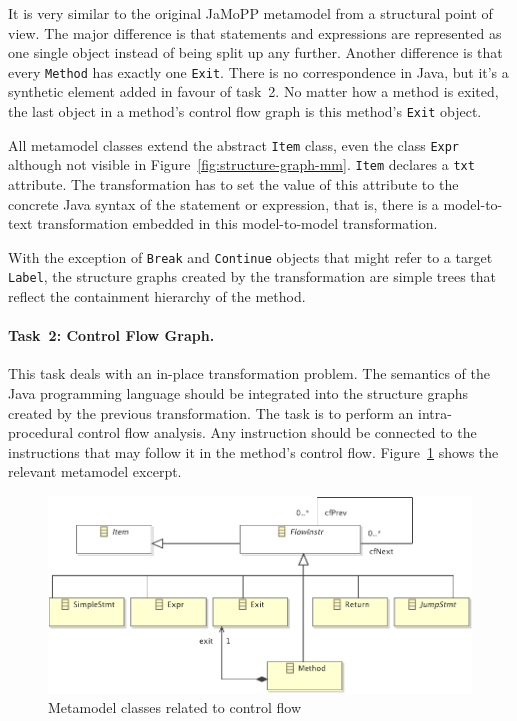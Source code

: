 \documentclass[submission]{eptcs}
\begin{document}
It is very similar to the original JaMoPP metamodel from a structural point of
view.  The major difference is that statements and expressions are represented
as one single object instead of being split up any further.  Another difference
is that every \verb|Method| has exactly one \verb|Exit|.  There is no
correspondence in Java, but it's a synthetic element added in favour of task~2.
No matter how a method is exited, the last object in a method's control flow
graph is this method's \verb|Exit| object.

All metamodel classes extend the abstract \verb|Item| class, even the class
\verb|Expr| although not visible in Figure~\ref{fig:structure-graph-mm}.
\verb|Item| declares a \verb|txt| attribute.  The transformation has to set the
value of this attribute to the concrete Java syntax of the statement or
expression, that is, there is a model-to-text transformation embedded in this
model-to-model transformation.

With the exception of \verb|Break| and \verb|Continue| objects that might refer
to a target \verb|Label|, the structure graphs created by the transformation
are simple trees that reflect the containment hierarchy of the method.

\paragraph{Task~2: Control Flow Graph.}
\label{sec:task2-cf-graph}

This task deals with an in-place transformation problem.  The semantics of the
Java programming language should be integrated into the structure graphs
created by the previous transformation.  The task is to perform an
intra-procedural control flow analysis.  Any instruction should be connected to
the instructions that may follow it in the method's control flow.
Figure~\ref{fig:control-flow-mm} shows the relevant metamodel excerpt.

\begin{figure}[h!]
  \centering
  \includegraphics[width=0.7\linewidth]{ControlFlowGraph}
  \caption{Metamodel classes related to control flow}
  \label{fig:control-flow-mm}
\end{figure}
\end{document}
